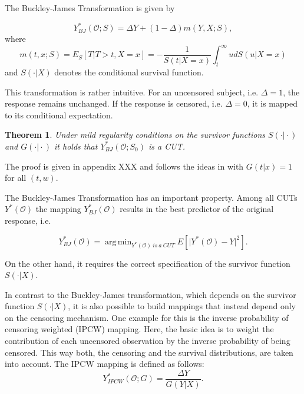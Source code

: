 \documentclass[12pt, a4paper]{scrartcl}
\theoremstyle{definition}
\theoremstyle{plain}
\newtheorem{Theorem}{Theorem}[section]
\numberwithin{equation}{section}
\numberwithin{figure}{section}
\numberwithin{table}{section}
\DeclareMathOperator*{\argmin}{arg\,min}
\begin{document}
	The Buckley-James Transformation is given by
	
	\begin{equation}\label{eq:bjtrafo}
		Y_{BJ}^* (\mathcal{O}; S) = \Delta Y + (1-\Delta)m(Y,X;S),
	\end{equation}
	where
	\begin{equation}\label{eq:condmean}
		m(t,x;S) = E_S[T \vert T > t, X=x] = -\frac{1}{S(t\vert X=x)} \int_t^{\infty} u dS(u\vert X=x)
	\end{equation}%
	and $S(\cdot\vert X)$ denotes the conditional survival function.
	
	This transformation is rather intuitive.
	For an uncensored subject, i.e. $\Delta = 1$, the response remains unchanged.
	If the response is censored, i.e. $\Delta = 0$, it is mapped to its conditional expectation. %
	
	\begin{Theorem}\label{thm:bj}
		Under mild regularity conditions on the survivor functions $S(\cdot\vert\cdot)$ and $G(\cdot\vert\cdot)$ it holds that $Y_{BJ}^*(\mathcal{O}; S_0)$ is a CUT.
	\end{Theorem}
	
	The proof is given in appendix XXX and follows the ideas in \citet*{drcut} with $G(t\vert x)=1$ for all $(t,w)$.
	
	The Buckley-James Transformation has an important property.
	Among all CUTs $Y^*(\mathcal{O})$ the mapping $Y_{BJ}^* (\mathcal{O})$ results in the best predictor of the original response, i.e.
	
	\begin{equation*}
	Y_{BJ}^* (\mathcal{O})= \argmin_{Y^*(\mathcal{O})~is~a~CUT} E[ \vert Y^*(\mathcal{O}) - Y \vert ^2].
	\end{equation*}
	
	On the other hand, it requires the correct specification of the survivor function $S(\cdot\vert X)$.

	In contrast to the Buckley-James transformation, which depends on the survivor function $S(\cdot\vert X)$, it is also possible to build mappings that instead depend only on the censoring mechanism.
	One example for this is the inverse probability of censoring weighted (IPCW) mapping.
	Here, the basic idea is to weight the contribution of each uncensored observation by the inverse probability of being censored.
	This way both, the censoring and the survival distributions, are taken into account.
	The IPCW mapping is defined as follows:
	\begin{equation*}
	Y_{IPCW}^*(\mathcal{O}; G) = \frac{\Delta Y}{G(Y \vert X)}.
	\end{equation*}
\end{document}
